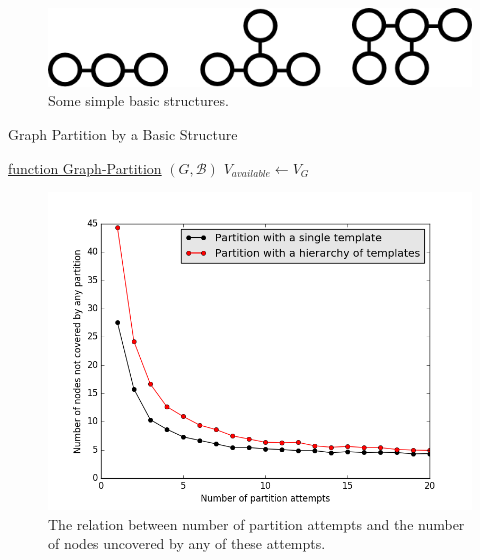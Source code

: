 \documentclass[10pt, titlepage]{article}
\theoremstyle{definition}
\begin{document}
\begin{figure}[!htb]
    \centering
    \captionsetup{width=.8\linewidth}
    \includegraphics[scale=0.5]{images/example_basics.png}
    \caption{Some simple basic structures.}
    \label{fig:basic_struct}
\end{figure}

\begin{algorithm}
    \caption{Graph Partition by a Basic Structure}
    \label{alg:part_graph}

    \underline{function Graph-Partition} $(G, \mathcal{B})$\;
    $V_{available}\gets V_G$\;
\end{algorithm}

\begin{figure}[!htb]
    \centering
    \captionsetup{width=.8\linewidth}
    \includegraphics[scale=0.5]{images/partition_loss.png}
    \caption{The relation between number of partition attempts and the number of nodes uncovered by any of these attempts.}
    \label{fig:part_drop}
\end{figure}
\end{document}
